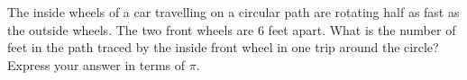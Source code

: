 The inside wheels of a car travelling on a circular path are rotating half as fast as the outside wheels. The two front wheels are $6$ feet apart. What is the number of feet in the path traced by the inside front wheel in one trip around the circle? Express your answer in terms of $\pi$.
